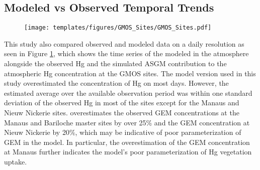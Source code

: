 
\subsection{Modeled vs Observed Temporal Trends}
\begin{figure}[H]
\texttt{[image: templates/figures/GMOS\_Sites/GMOS\_Sites.pdf]}
\centering
{}
\label{fig:GMOSvsGC}
\end{figure}
\FloatBarrier


\begin{flushleft}


 This study also compared observed and modeled data on a daily resolution as seen in Figure \ref{fig:GMOSvsGC}, which shows the time series of the modeled \hgc in the atmosphere alongside the observed Hg and the simulated ASGM contribution to the atmospheric Hg concentration at the GMOS sites. The \gc model version used in this study overestimated the concentration of Hg on most days. However, the \gc estimated average \hgc over the available observation period was within one standard deviation of the observed Hg in most of the sites except for the Manaus and Nieuw Nickerie sites. \gcs overestimates the observed GEM concentrations at the Manaus and Bariloche master sites by over 25\%  and the GEM concentration at Nieuw Nickerie by 20\%, which may be indicative of poor parameterization of GEM in the model. In particular, the overestimation of the GEM concentration at Manaus further indicates the model's poor parameterization of Hg vegetation uptake.
\end{flushleft}


